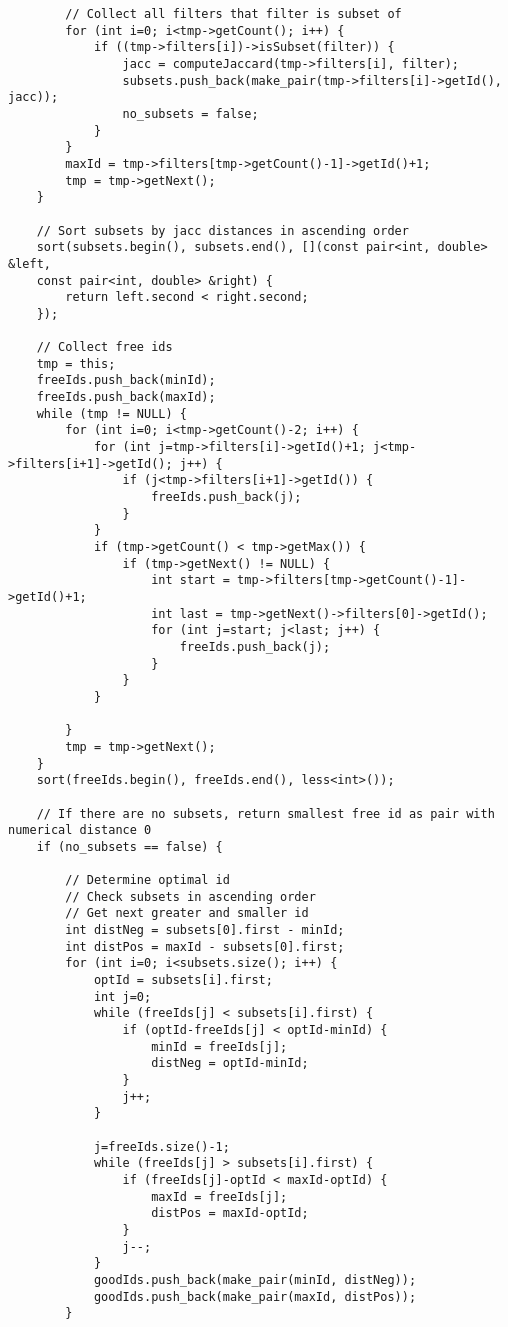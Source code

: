 {{\begin{verbatim}
        // Collect all filters that filter is subset of
        for (int i=0; i<tmp->getCount(); i++) {
            if ((tmp->filters[i])->isSubset(filter)) {
                jacc = computeJaccard(tmp->filters[i], filter);
                subsets.push_back(make_pair(tmp->filters[i]->getId(), jacc));
                no_subsets = false;
            }
        }
        maxId = tmp->filters[tmp->getCount()-1]->getId()+1;
        tmp = tmp->getNext();
    }
    
    // Sort subsets by jacc distances in ascending order
    sort(subsets.begin(), subsets.end(), [](const pair<int, double> &left, 
    const pair<int, double> &right) {
        return left.second < right.second;
    });
    
    // Collect free ids
    tmp = this;
    freeIds.push_back(minId);
    freeIds.push_back(maxId);
    while (tmp != NULL) {
        for (int i=0; i<tmp->getCount()-2; i++) {
            for (int j=tmp->filters[i]->getId()+1; j<tmp->filters[i+1]->getId(); j++) {
                if (j<tmp->filters[i+1]->getId()) {
                    freeIds.push_back(j);
                }
            }
            if (tmp->getCount() < tmp->getMax()) {
                if (tmp->getNext() != NULL) {
                    int start = tmp->filters[tmp->getCount()-1]->getId()+1;
                    int last = tmp->getNext()->filters[0]->getId();
                    for (int j=start; j<last; j++) {
                        freeIds.push_back(j);
                    }
                }
            }
            
        }
        tmp = tmp->getNext();
    }
    sort(freeIds.begin(), freeIds.end(), less<int>());
    
    // If there are no subsets, return smallest free id as pair with numerical distance 0
    if (no_subsets == false) {
        
        // Determine optimal id
        // Check subsets in ascending order
        // Get next greater and smaller id
        int distNeg = subsets[0].first - minId;
        int distPos = maxId - subsets[0].first;
        for (int i=0; i<subsets.size(); i++) {
            optId = subsets[i].first;
            int j=0;
            while (freeIds[j] < subsets[i].first) {
                if (optId-freeIds[j] < optId-minId) {
                    minId = freeIds[j];
                    distNeg = optId-minId;
                }
                j++;
            }
            
            j=freeIds.size()-1;
            while (freeIds[j] > subsets[i].first) {
                if (freeIds[j]-optId < maxId-optId) {
                    maxId = freeIds[j];
                    distPos = maxId-optId;
                }
                j--;
            }
            goodIds.push_back(make_pair(minId, distNeg));
            goodIds.push_back(make_pair(maxId, distPos));
        }
        

\end{verbatim}}}
